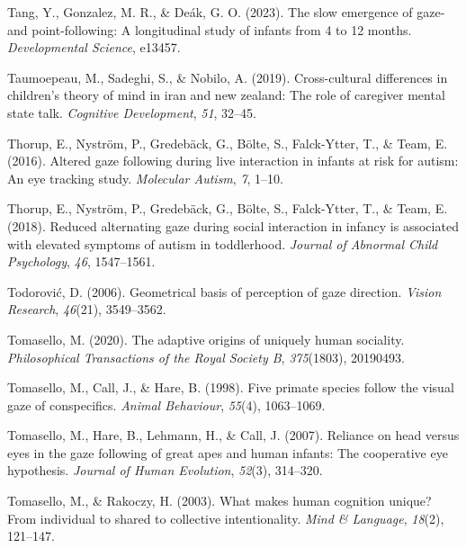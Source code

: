 \documentclass[
  man,floatsintext]{apa7}
\newlength{\cslhangindent}
\newlength{\cslentryspacingunit} %
\newenvironment{CSLReferences}[2] %
 {%
  \setlength{\parindent}{0pt}
  \ifodd #1
  \let\oldpar\par
  \def\par{\hangindent=\cslhangindent\oldpar}
  \fi
  \setlength{\parskip}{#2\cslentryspacingunit}
 }%
 {}
\begin{document}
\begin{CSLReferences}{1}{0}
\leavevmode{}%
Tang, Y., Gonzalez, M. R., \& Deák, G. O. (2023). The slow emergence of gaze-and point-following: A longitudinal study of infants from 4 to 12 months. \emph{Developmental Science}, e13457.

\leavevmode{}%
Taumoepeau, M., Sadeghi, S., \& Nobilo, A. (2019). Cross-cultural differences in children's theory of mind in iran and new zealand: The role of caregiver mental state talk. \emph{Cognitive Development}, \emph{51}, 32--45.

\leavevmode{}%
Thorup, E., Nyström, P., Gredebäck, G., Bölte, S., Falck-Ytter, T., \& Team, E. (2016). Altered gaze following during live interaction in infants at risk for autism: An eye tracking study. \emph{Molecular Autism}, \emph{7}, 1--10.

\leavevmode{}%
Thorup, E., Nyström, P., Gredebäck, G., Bölte, S., Falck-Ytter, T., \& Team, E. (2018). Reduced alternating gaze during social interaction in infancy is associated with elevated symptoms of autism in toddlerhood. \emph{Journal of Abnormal Child Psychology}, \emph{46}, 1547--1561.

\leavevmode{}%
Todorović, D. (2006). Geometrical basis of perception of gaze direction. \emph{Vision Research}, \emph{46}(21), 3549--3562.

\leavevmode{}%
Tomasello, M. (2020). The adaptive origins of uniquely human sociality. \emph{Philosophical Transactions of the Royal Society B}, \emph{375}(1803), 20190493.

\leavevmode{}%
Tomasello, M., Call, J., \& Hare, B. (1998). Five primate species follow the visual gaze of conspecifics. \emph{Animal Behaviour}, \emph{55}(4), 1063--1069.

\leavevmode{}%
Tomasello, M., Hare, B., Lehmann, H., \& Call, J. (2007). Reliance on head versus eyes in the gaze following of great apes and human infants: The cooperative eye hypothesis. \emph{Journal of Human Evolution}, \emph{52}(3), 314--320.

\leavevmode{}%
Tomasello, M., \& Rakoczy, H. (2003). What makes human cognition unique? From individual to shared to collective intentionality. \emph{Mind \& Language}, \emph{18}(2), 121--147.


\end{CSLReferences}
\end{document}

